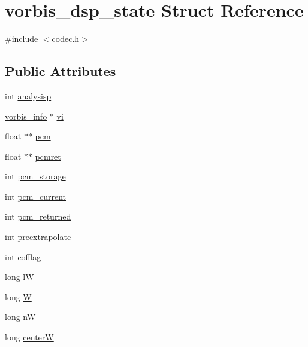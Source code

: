 \hypertarget{structvorbis__dsp__state}{}\section{vorbis\+\_\+dsp\+\_\+state Struct Reference}
\label{structvorbis__dsp__state}


{\ttfamily \#include $<$codec.\+h$>$}

\subsection*{Public Attributes}
\begin{DoxyCompactItemize}
\item 
int \mbox{\hyperlink{structvorbis__dsp__state_a9b983a6901a311f2d354f2b6c51cf93b}{analysisp}}
\item 
\mbox{\hyperlink{structvorbis__info}{vorbis\+\_\+info}} $\ast$ \mbox{\hyperlink{structvorbis__dsp__state_ab6819a31e79031cdcd8f2ff40a5c1def}{vi}}
\item 
float $\ast$$\ast$ \mbox{\hyperlink{structvorbis__dsp__state_ab33bafd2638e5bea5737709feea89027}{pcm}}
\item 
float $\ast$$\ast$ \mbox{\hyperlink{structvorbis__dsp__state_ab2c2a87593f0d7a3c867ba80102c4260}{pcmret}}
\item 
int \mbox{\hyperlink{structvorbis__dsp__state_a33cf1637859094c31429dace6dfc79e2}{pcm\+\_\+storage}}
\item 
int \mbox{\hyperlink{structvorbis__dsp__state_a6d09bbf3927e337d721b05f669bd70c6}{pcm\+\_\+current}}
\item 
int \mbox{\hyperlink{structvorbis__dsp__state_a8db33e5f4c0b7f31f218c9ff6ccd7ac3}{pcm\+\_\+returned}}
\item 
int \mbox{\hyperlink{structvorbis__dsp__state_aecc3c42d23d876c8bfd396b5c2ac5eb6}{preextrapolate}}
\item 
int \mbox{\hyperlink{structvorbis__dsp__state_af48b32e7555d54a5d18a24385f1296d0}{eofflag}}
\item 
long \mbox{\hyperlink{structvorbis__dsp__state_a7086b355f6ffe286f388e95df943cac0}{lW}}
\item 
long \mbox{\hyperlink{structvorbis__dsp__state_a1cc3a520dcf831fb967341e5095c7b38}{W}}
\item 
long \mbox{\hyperlink{structvorbis__dsp__state_a2ada93ee1004bcc0803238ee4416bc1e}{nW}}
\item 
long \mbox{\hyperlink{structvorbis__dsp__state_a241d3dc3b6c931e93ce53cbf69282350}{centerW}}

\end{DoxyCompactItemize}
